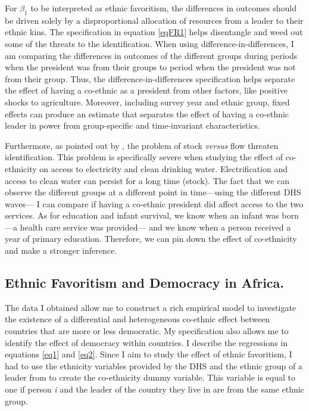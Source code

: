 \documentclass{wptemp}
\begin{document}
For $\beta_{1}$ to be interpreted as ethnic favoritism, the differences in outcomes should be driven solely by a disproportional allocation of resources from a leader to their ethnic kins. The specification in equation \ref{eqFR1} helps disentangle and weed out some of the threats to the identification. When using difference-in-differences, I am comparing the differences in outcomes of the different groups during periods when the president was from their groups to period when the president was not from their group. Thus, the difference-in-differences specification helps separate the effect of having a co-ethnic as a president from other factors, like positive shocks to agriculture. Moreover, including survey year and ethnic group, fixed effects can produce an estimate that separates the effect of having a co-ethnic leader in power from group-specific and time-invariant characteristics.

Furthermore, as pointed out by \citet{kramon2013benefits}, the problem of stock \textit{versus} flow threaten identification. This problem is specifically severe when studying the effect of co-ethnicity on access to electricity and clean drinking water. Electrification and access to clean water can persist for a long time (stock). The fact that we can observe the different groups at a different point in time---using the different DHS waves--- I can compare if having a co-ethnic president did affect access to the two services. As for education and infant survival, we know when an infant was born---a health care service was provided--- and we know when a person received a year of primary education. Therefore, we can pin down the effect of co-ethnicity and make a stronger inference.

\subsection{Ethnic Favoritism and Democracy in Africa.}
The data I obtained allow me to construct a rich empirical model to investigate the existence of a differential and heterogeneous co-ethnic effect between countries that are more or less democratic. My specification also allows me to identify the effect of democracy within countries. I describe the regressions in equations \ref{eq1} and \ref{eq2}. Since I aim to study the effect of ethnic favoritism, I had to use the ethnicity variables provided by the DHS and the ethnic group of a leader from \citet{fearon2007ethnic} to create the co-ethnicity dummy variable. This variable is equal to one if person \textit{i} and the leader of the country they live in are from the same ethnic group. 
\end{document}
